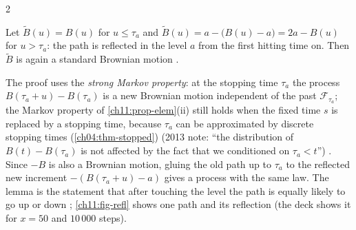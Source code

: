 \begin{paracol}{2}
\begin{lemma}\label{ch11:lem-reflection}
Let $\widetilde B(u)=B(u)$ for $u\le\tau_a$ and $\widetilde B(u)=a-\bigl(B(u)-a\bigr)=2a-B(u)$ for $u>\tau_a$: the path is
reflected in the level $a$ from the first hitting time on. Then $\widetilde B$ is again a standard Brownian motion
.
\end{lemma}
The proof uses the \emph{strong Markov property}: at the stopping time $\tau_a$ the process $B(\tau_a+u)-B(\tau_a)$ is a new
Brownian motion independent of the past $\mathcal F_{\tau_a}$; the Markov property of \cref{ch11:prop-elem}(ii) still holds when the fixed time $s$ is replaced by a
stopping time, because $\tau_a$ can be approximated by discrete stopping times (\cref{ch04:thm-stopped}) (2013 note: ``the
distribution of $B(t)-B(\tau_a)$ is not affected by the fact that we conditioned on $\tau_a<t$'') . Since $-B$ is
also a Brownian motion, gluing the old path up to $\tau_a$ to the reflected new increment $-(B(\tau_a+u)-a)$ gives
a process with the same law. The lemma is the statement that after touching the level the path is equally likely to go
up or down ; \cref{ch11:fig-refl} shows one path and its reflection (the deck
 shows it for $x=50$ and $10\,000$ steps).


\end{paracol}
